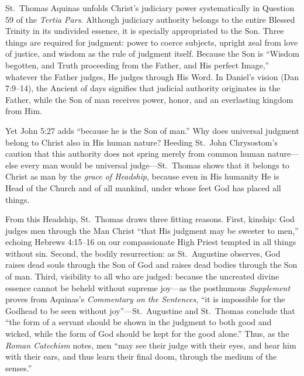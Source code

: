 St.\ Thomas Aquinas unfolds Christ's judiciary power systematically in Question 59 of the \textit{Tertia Pars}. Although judiciary authority belongs to the entire Blessed Trinity in its undivided essence, it is specially appropriated to the Son. Three things are required for judgment: power to coerce subjects, upright zeal from love of justice, and wisdom as the rule of judgment itself. Because the Son is ``Wisdom begotten, and Truth proceeding from the Father, and His perfect Image,'' whatever the Father judges, He judges through His Word. In Daniel's vision (Dan 7:9--14), the Ancient of days signifies that judicial authority originates in the Father, while the Son of man receives power, honor, and an everlasting kingdom from Him.

Yet John 5:27 adds ``because he is the Son of man.'' Why does universal judgment belong to Christ also in His human nature? Heeding St.\ John Chrysostom's caution that this authority does not spring merely from common human nature---else every man would be universal judge---St.\ Thomas shows that it belongs to Christ as man by the \textit{grace of Headship}, because even in His humanity He is Head of the Church and of all mankind, under whose feet God has placed all things.

From this Headship, St.\ Thomas draws three fitting reasons. First, kinship: God judges men through the Man Christ ``that His judgment may be sweeter to men,'' echoing Hebrews 4:15--16 on our compassionate High Priest tempted in all things without sin. Second, the bodily resurrection: as St.\ Augustine observes, God raises dead souls through the Son of God and raises dead bodies through the Son of man. Third, visibility to all who are judged: because the uncreated divine essence cannot be beheld without supreme joy---as the posthumous \textit{Supplement} proves from Aquinas's \textit{Commentary on the Sentences}, ``it is impossible for the Godhead to be seen without joy''---St.\ Augustine and St.\ Thomas conclude that ``the form of a servant should be shown in the judgment to both good and wicked, while the form of God should be kept for the good alone.'' Thus, as the \textit{Roman Catechism} notes, men ``may see their judge with their eyes, and hear him with their ears, and thus learn their final doom, through the medium of the senses.''

